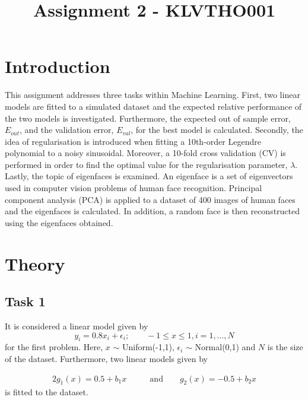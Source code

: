 \documentclass[a4paper,10pt]{article}
\begin{document}
\setlength\parindent{0pt}


\title{Assignment 2 - KLVTHO001}
\clearpage\maketitle
\thispagestyle{empty}


\newpage
\clearpage
\setcounter{page}{1}

\section{Introduction}
This assignment addresses three tasks within Machine Learning. First, two linear models are fitted
to a simulated dataset and the expected relative performance of the two models is investigated. Furthermore,
the expected out of sample error, $E_{out}$, and the validation error, $E_{val}$, for the best
model is calculated. Secondly, the idea of regularisation is introduced
when fitting a 10th-order Legendre polynomial to a noisy sinusoidal. Moreover,
a 10-fold cross validation (CV) is performed in order to find the optimal value for the
regularisation parameter, $\lambda$. Lastly, the topic of eigenfaces is examined. An eigenface is
a set of eigenvectors used in computer vision problems of human face recognition.
Principal component analysis (PCA) is applied to a dataset of 400 images of human faces and
the eigenfaces is calculated. In addition, a random face is then reconstructed using the eigenfaces
obtained.

\section{Theory}
\subsection{Task 1}
It is considered a linear model given by
\begin{equation}
  y_i = 0.8x_i + \epsilon_i;\qquad -1 \leq x \leq1, i=1,...,N
  \label{eq:underlying_function}
\end{equation}
for the first problem. Here, $x$ $\sim$ Uniform(-1,1), $\epsilon_i$ $\sim$ Normal(0,1) and $N$ is the
size of the dataset. Furthermore, two linear models given by

\begin{alignat*}{2}
  g_1(x) = 0.5 + b_1x  &\qquad\text{and}\qquad g_2(x) = -0.5 + b_2x
\end{alignat*}
is fitted to the dataset. \newline
\end{document}

